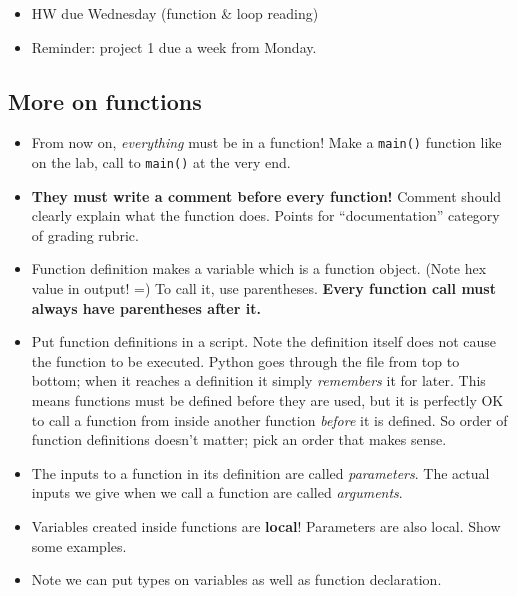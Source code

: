 \documentclass{article}
\newcommand{\notready}{\textcolor{red}{\XSolidBold}\xspace}
\begin{document}
\begin{itemize}
\item \notready HW due Wednesday (function \& loop reading)
\item Reminder: project 1 due a week from Monday.
\end{itemize}

\subsection*{More on functions}

\begin{itemize}
\item From now on, \emph{everything} must be in a function!  Make a
  \verb|main()| function like on the lab, call to \verb|main()| at the
  very end.

\item \textbf{They must write a comment before every function!}
  Comment should clearly explain what the function does.  Points for
  ``documentation'' category of grading rubric.

\item Function definition makes a variable which is a function
  object. (Note hex value in output! =) To call it, use parentheses.
  \textbf{Every function call must always have parentheses after it.}

\item Put function definitions in a script.  Note the definition
  itself does not cause the function to be executed.  Python goes
  through the file from top to bottom; when it reaches a definition it
  simply \emph{remembers} it for later.  This means functions must be
  defined before they are used, but it is perfectly OK to call a
  function from inside another function \emph{before} it is defined.
  So order of function definitions doesn't matter; pick an order that
  makes sense.

\item The inputs to a function in its definition are called
  \emph{parameters}.  The actual inputs we give when we call a
  function are called \emph{arguments}.

\item Variables created inside functions are \textbf{local}!
  Parameters are also local.  Show some examples.

\item Note we can put types on variables as well as function
  declaration.
\end{itemize}
\end{document}
